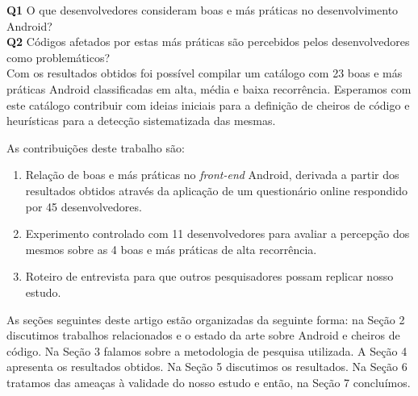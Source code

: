 \textbf{Q1} O que desenvolvedores consideram boas e más práticas no desenvolvimento Android? \\

\textbf{Q2} Códigos afetados por estas más práticas são percebidos pelos desenvolvedores como problemáticos? \\

Com os resultados obtidos foi possível compilar um catálogo com 23 boas e más práticas Android classificadas em alta, média e baixa recorrência. Esperamos com este catálogo contribuir com ideias iniciais para a definição de cheiros de código e heurísticas para a detecção sistematizada das mesmas.

As contribuições deste trabalho são:

\begin{enumerate}

	\item Relação de boas e más práticas no \textit{front-end} Android, derivada a partir dos resultados obtidos através da aplicação de um questionário online respondido por 45 desenvolvedores.

	\item Experimento controlado com 11 desenvolvedores para avaliar a percepção dos mesmos sobre as 4 boas e más práticas de alta recorrência.

	\item Roteiro de entrevista para que outros pesquisadores possam replicar nosso estudo.
\end{enumerate}

As seções seguintes deste artigo estão organizadas da seguinte forma: na Seção 2 discutimos trabalhos relacionados e o estado da arte sobre Android e cheiros de código. Na Seção 3 falamos sobre a metodologia de pesquisa utilizada. A Seção 4 apresenta os resultados obtidos. Na Seção 5 discutimos os resultados. Na Seção 6 tratamos das ameaças à validade do nosso estudo e então, na Seção 7 concluímos.
